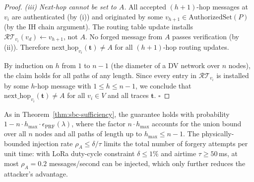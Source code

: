 \begin{proof}
\medskip
\noindent\emph{(iii) Next-hop cannot be set to $A$.}\;
All accepted $(h+1)$-hop messages at $v_i$ are authenticated (by (i))
and originated by some $v_{h+1} \in \mathrm{AuthorizedSet}(P)$
(by the IH chain argument).
The routing table update installs
$\mathcal{RT}_{v_i}(v_d) \leftarrow v_{h+1}$, not $A$.
No forged message from $A$ passes verification (by (ii)).
Therefore $\mathrm{next\_hop}_{v_i}(\mathbf{t}) \neq A$ for all
$(h+1)$-hop routing updates.

\medskip
By induction on $h$ from $1$ to $n-1$ (the diameter of a DV network
over $n$ nodes), the claim holds for all paths of any length.
Since every entry in $\mathcal{RT}_{v_i}$ is installed by some $h$-hop
message with $1 \le h \le n-1$, we conclude that
$\mathrm{next\_hop}_{v_i}(\mathbf{t}) \neq A$ for all $v_i \in V$
and all traces $\mathbf{t}$.
\hfill$\square$
\end{proof}

\begin{remark}
\label{rem:physical-bound-multihop}
As in Theorem~\ref{thm:sbc-sufficiency}, the guarantee holds with
probability $1 - n \cdot h_{\max} \cdot \epsilon_{\mathrm{PRF}}(\lambda)$,
where the factor $n \cdot h_{\max}$ accounts for the union bound over
all $n$ nodes and all paths of length up to $h_{\max} \le n-1$.
The physically-bounded injection rate $\rho_A \le \delta/\tau$ limits the
total number of forgery attempts per unit time: with LoRa duty-cycle
constraint $\delta \le 1\%$ and airtime $\tau \ge 50$\,ms, at most
$\rho_A = 0.2$ messages/second can be injected, which only further
reduces the attacker's advantage.
\end{remark}


